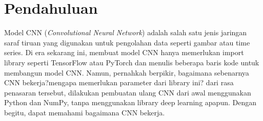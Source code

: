\documentclass[12pt, letterpaper]{article}
\begin{document}
\clearpage
\section*{Pendahuluan}
Model CNN (\textit{Convolutional Neural Network}) adalah salah satu jenis jaringan saraf tiruan yang digunakan untuk pengolahan data seperti gambar atau time series. Di era sekarang ini, membuat model CNN hanya memerlukan import library seperti TensorFlow atau PyTorch dan menulis beberapa baris kode untuk membangun model CNN. Namun, pernahkah berpikir, bagaimana sebenarnya CNN bekerja?mengapa memerlukan parameter dari library ini? dari rasa penasaran tersebut, dilakukan pembuatan ulang CNN dari awal menggunakan Python dan NumPy, tanpa menggunakan library deep learning apapun. Dengan begitu, dapat memahami bagaimana CNN bekerja. 
\end{document}
